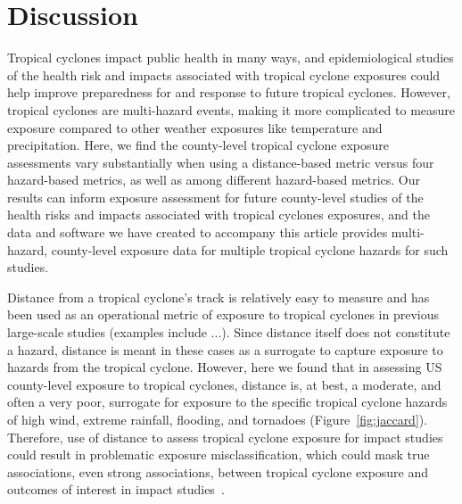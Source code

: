 \section*{Discussion}

Tropical cyclones impact public health in many ways, and epidemiological
studies of the health risk and impacts associated with tropical cyclone
exposures could help improve preparedness for and response to future tropical
cyclones.  However, tropical cyclones are multi-hazard events, making it more
complicated to measure exposure compared to other weather exposures like
temperature and precipitation. Here, we find the county-level tropical cyclone
exposure assessments vary substantially when using a distance-based metric
versus four hazard-based metrics, as well as among different hazard-based
metrics. Our results can inform exposure assessment for future county-level
studies of the health risks and impacts associated with tropical cyclones
exposures, and the data and software we have created to accompany this article
provides multi-hazard, county-level exposure data for multiple tropical cyclone
hazards for such studies.

Distance from a tropical cyclone's track is relatively easy to measure and has
been used as an operational metric of exposure to tropical cyclones in previous
large-scale studies (examples include ...). Since distance itself
does not constitute a hazard, distance is meant in these cases as a surrogate
to capture exposure to hazards from the tropical cyclone. However, here we
found that in assessing \ac{US} county-level exposure to tropical cyclones,
distance is, at best, a moderate, and often a very poor, surrogate for exposure
to the specific tropical cyclone hazards of high wind, extreme rainfall,
flooding, and tornadoes (Figure~\ref{fig:jaccard}).  Therefore, use of distance
to assess tropical cyclone exposure for impact studies could result in
problematic exposure misclassification, which could mask true associations,
even strong associations, between tropical cyclone exposure and outcomes of
interest in impact studies~\citep{savitz2016interpreting, armstrong1998effect}. 

